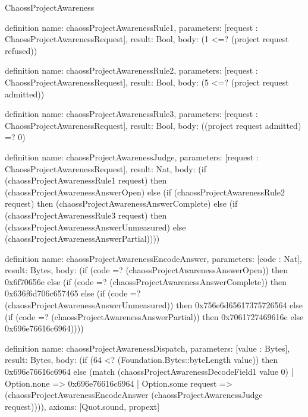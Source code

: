 \begin{lexlean}{ChaossProjectAwareness}
\begin{semanticmodule}
definition{
  name: chaossProjectAwarenessRule1,
  parameters: [request : ChaossProjectAwarenessRequest],
  result: Bool,
  body: (1 <=? (project request refused))
}

definition{
  name: chaossProjectAwarenessRule2,
  parameters: [request : ChaossProjectAwarenessRequest],
  result: Bool,
  body: (5 <=? (project request admitted))
}

definition{
  name: chaossProjectAwarenessRule3,
  parameters: [request : ChaossProjectAwarenessRequest],
  result: Bool,
  body: ((project request admitted) =? 0)
}

definition{
  name: chaossProjectAwarenessJudge,
  parameters: [request : ChaossProjectAwarenessRequest],
  result: Nat,
  body: (if (chaossProjectAwarenessRule1 request) then (chaossProjectAwarenessAnswerOpen) else (if (chaossProjectAwarenessRule2 request) then (chaossProjectAwarenessAnswerComplete) else (if (chaossProjectAwarenessRule3 request) then (chaossProjectAwarenessAnswerUnmeasured) else (chaossProjectAwarenessAnswerPartial))))
}

definition{
  name: chaossProjectAwarenessEncodeAnswer,
  parameters: [code : Nat],
  result: Bytes,
  body: (if (code =? (chaossProjectAwarenessAnswerOpen)) then 0x6f70656e else (if (code =? (chaossProjectAwarenessAnswerComplete)) then 0x636f6d706c657465 else (if (code =? (chaossProjectAwarenessAnswerUnmeasured)) then 0x756e6d65617375726564 else (if (code =? (chaossProjectAwarenessAnswerPartial)) then 0x7061727469616c else 0x696e76616c6964))))
}

definition{
  name: chaossProjectAwarenessDispatch,
  parameters: [value : Bytes],
  result: Bytes,
  body: (if (64 <? (Foundation.Bytes::byteLength value)) then 0x696e76616c6964 else (match (chaossProjectAwarenessDecodeField1 value 0)
    | Option.none => 0x696e76616c6964
    | Option.some request => (chaossProjectAwarenessEncodeAnswer (chaossProjectAwarenessJudge request)))),
  axioms: [Quot.sound, propext]
}
\end{semanticmodule}
\end{lexlean}
